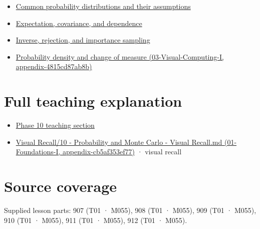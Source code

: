 \begin{itemize}
\tightlist
\item
  \hyperref[appendix-a2360b435383]{Common probability distributions and their assumptions}
\item
  \hyperref[appendix-54c383df9992]{Expectation, covariance, and dependence}
\item
  \hyperref[appendix-8d863ed954d0]{Inverse, rejection, and importance sampling}
\item
  \href{../03-Visual-Computing-I/main.pdf\#nameddest=appendix-4815cd87ab8b}{Probability density and change of measure (03-Visual-Computing-I, appendix-4815cd87ab8b)}
\end{itemize}

\section{Full teaching explanation}\label{appendix-4d0203f7944f-full-teaching-explanation}

\begin{itemize}
\tightlist
\item
  \href{Continuous\%20Notes/Computing\%20Foundations\%20-\%20From\%20Bits\%20to\%20C++\%20and\%20Systems\%20APIs\#2.\%20Random\%20quantities\%20and\%20their\%20probability\%20laws}{Phase 10 teaching section}
\item
  \href{../01-Foundations-I/main.pdf\#nameddest=appendix-cb5af353ef77}{Visual Recall/10 - Probability and Monte Carlo - Visual Recall.md (01-Foundations-I, appendix-cb5af353ef77)} · visual recall
\end{itemize}

\section{Source coverage}\label{appendix-4d0203f7944f-source-coverage}

Supplied lesson parts: 907 (T01 · M055), 908 (T01 · M055), 909 (T01 · M055), 910 (T01 · M055), 911 (T01 · M055), 912 (T01 · M055).
